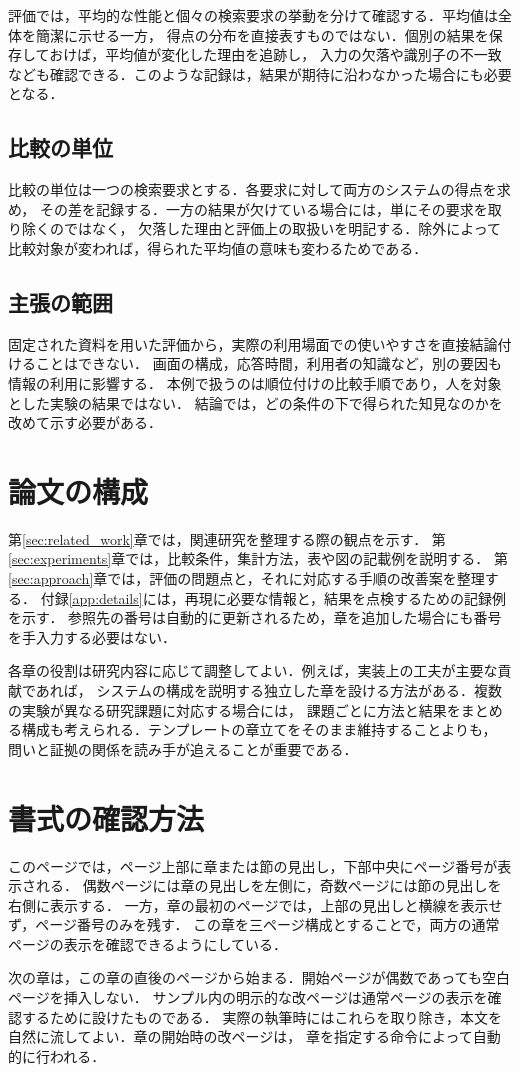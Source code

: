 評価では，平均的な性能と個々の検索要求の挙動を分けて確認する．平均値は全体を簡潔に示せる一方，
得点の分布を直接表すものではない．個別の結果を保存しておけば，平均値が変化した理由を追跡し，
入力の欠落や識別子の不一致なども確認できる．このような記録は，結果が期待に沿わなかった場合にも必要となる．

\subsection{比較の単位}
比較の単位は一つの検索要求とする．各要求に対して両方のシステムの得点を求め，
その差を記録する．一方の結果が欠けている場合には，単にその要求を取り除くのではなく，
欠落した理由と評価上の取扱いを明記する．除外によって比較対象が変われば，得られた平均値の意味も変わるためである．

\subsection{主張の範囲}
固定された資料を用いた評価から，実際の利用場面での使いやすさを直接結論付けることはできない．
画面の構成，応答時間，利用者の知識など，別の要因も情報の利用に影響する．
本例で扱うのは順位付けの比較手順であり，人を対象とした実験の結果ではない．
結論では，どの条件の下で得られた知見なのかを改めて示す必要がある．

\newpage
\section{論文の構成}
第\ref{sec:related_work}章では，関連研究を整理する際の観点を示す．
第\ref{sec:experiments}章では，比較条件，集計方法，表や図の記載例を説明する．
第\ref{sec:approach}章では，評価の問題点と，それに対応する手順の改善案を整理する．
付録\ref{app:details}には，再現に必要な情報と，結果を点検するための記録例を示す．
参照先の番号は自動的に更新されるため，章を追加した場合にも番号を手入力する必要はない．

各章の役割は研究内容に応じて調整してよい．例えば，実装上の工夫が主要な貢献であれば，
システムの構成を説明する独立した章を設ける方法がある．複数の実験が異なる研究課題に対応する場合には，
課題ごとに方法と結果をまとめる構成も考えられる．テンプレートの章立てをそのまま維持することよりも，
問いと証拠の関係を読み手が追えることが重要である．

\section{書式の確認方法}
このページでは，ページ上部に章または節の見出し，下部中央にページ番号が表示される．
偶数ページには章の見出しを左側に，奇数ページには節の見出しを右側に表示する．
一方，章の最初のページでは，上部の見出しと横線を表示せず，ページ番号のみを残す．
この章を三ページ構成とすることで，両方の通常ページの表示を確認できるようにしている．

次の章は，この章の直後のページから始まる．開始ページが偶数であっても空白ページを挿入しない．
サンプル内の明示的な改ページは通常ページの表示を確認するために設けたものである．
実際の執筆時にはこれらを取り除き，本文を自然に流してよい．章の開始時の改ページは，
章を指定する命令によって自動的に行われる．
